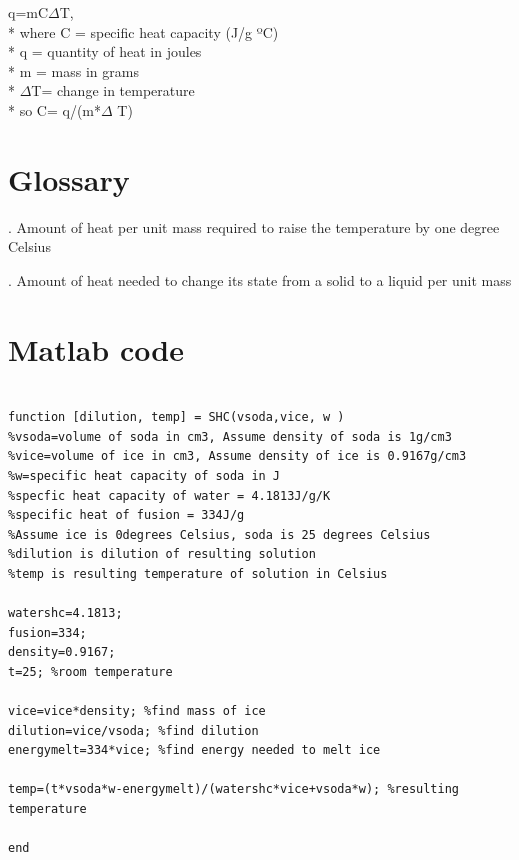 \documentclass[oneside,12pt]{report}
\begin{document}
q=mC$\Delta$T,
\\*  where C = specific heat capacity (J/g ºC)
\\* q = quantity of heat in joules 
\\* m = mass in grams
\\* $\Delta$T= change in temperature
\\*  so C= q/(m*$\Delta$ T)

\chapter{Glossary}\label{Glossary}

\vspace{10pt} 

\vspace{8pt}
. Amount of heat per unit mass required to raise the temperature by one degree Celsius

. Amount of heat needed to change its state from a solid to a liquid per unit mass

\chapter{Matlab code}\label{Matlab code}
\begin{lstlisting}[caption= Matlab code for calculating resulting temperature and dilution, label = matlab]

function [dilution, temp] = SHC(vsoda,vice, w )
%vsoda=volume of soda in cm3, Assume density of soda is 1g/cm3
%vice=volume of ice in cm3, Assume density of ice is 0.9167g/cm3
%w=specific heat capacity of soda in J
%specfic heat capacity of water = 4.1813J/g/K
%specific heat of fusion = 334J/g
%Assume ice is 0degrees Celsius, soda is 25 degrees Celsius
%dilution is dilution of resulting solution
%temp is resulting temperature of solution in Celsius

watershc=4.1813;
fusion=334;
density=0.9167;
t=25; %room temperature

vice=vice*density; %find mass of ice
dilution=vice/vsoda; %find dilution
energymelt=334*vice; %find energy needed to melt ice

temp=(t*vsoda*w-energymelt)/(watershc*vice+vsoda*w); %resulting temperature

end
\end{lstlisting}
\vspace{5pt}




\renewcommand\bibname{Selected Bibliography Including Cited Works}
\nocite{*}  %

\end{document}
